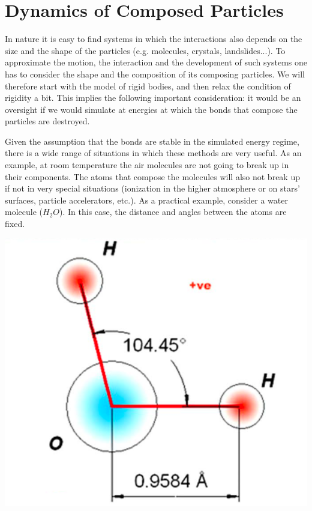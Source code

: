 
\section{Dynamics of Composed Particles}


In nature it is easy to find systems in which the interactions also depends on the size and the shape of the particles (e.g. molecules, crystals, landslides...). To approximate the motion, the interaction and the development of such systems one has to consider the shape and the composition of its composing particles. We will therefore start with the model of rigid bodies, and then relax the condition of rigidity a bit. This implies the following important consideration: it would be an oversight if we would simulate at energies at which the bonds that compose the particles are destroyed. 


\vspace{0.1cm}
\noindent
\begin{minipage}{\textwidth}
\begin{minipage}{.6\textwidth}%
Given the assumption that the bonds are stable in the simulated energy regime, there is a wide range of situations in which these methods are very useful. As an example, at room temperature the  air molecules are not going to break up in their components. The atoms that compose the molecules will also not break up if not in very special situations (ionization in the higher atmosphere or on stars' surfaces, particle accelerators, etc.). As a practical example, consider a water molecule ($H_2O$). In this case, the distance and angles between the atoms are fixed.
 \end{minipage}%
\hfill
\begin{minipage}{.4\textwidth}%
  \centering
  \includegraphics[width=\textwidth]{pics/water}
  \label{fig:water}
\end{minipage}
\end{minipage}
\vspace{0.1cm}

